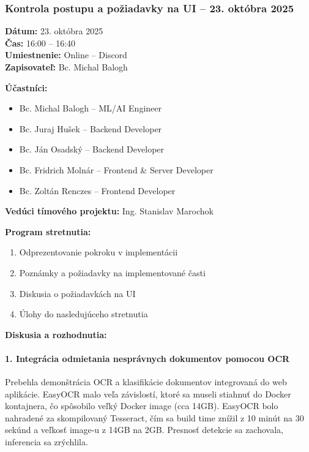 \subsubsection{Kontrola postupu a požiadavky na UI – 23. októbra 2025}

\textbf{Dátum:} 23. októbra 2025 \\
\textbf{Čas:} 16:00 – 16:40 \\
\textbf{Umiestnenie:} Online – Discord \\
\textbf{Zapisovateľ:} Bc. Michal Balogh

\vspace{0.5cm}
\textbf{Účastníci:}
\begin{itemize}
    \item Bc. Michal Balogh – ML/AI Engineer
    \item Bc. Juraj Hušek – Backend Developer
    \item Bc. Ján Osadský – Backend Developer
    \item Bc. Fridrich Molnár – Frontend \& Server Developer
    \item Bc. Zoltán Renczes – Frontend Developer
\end{itemize}

\textbf{Vedúci tímového projektu:} Ing. Stanislav Marochok

\vspace{0.5cm}
\textbf{Program stretnutia:}
\begin{enumerate}
    \item Odprezentovanie pokroku v implementácii
    \item Poznámky a požiadavky na implementované časti
    \item Diskusia o požiadavkách na UI
    \item Úlohy do nasledujúceho stretnutia
\end{enumerate}

\vspace{0.5cm}
\textbf{Diskusia a rozhodnutia:}

\paragraph{1. Integrácia odmietania nesprávnych dokumentov pomocou OCR}
Prebehla demonštrácia OCR a klasifikácie dokumentov integrovaná do web aplikácie. EasyOCR malo veľa závislostí, ktoré sa museli stiahnuť do Docker kontajnera, čo spôsobilo veľký Docker image (cca 14GB). EasyOCR bolo nahradené za skompilovaný Tesseract, čím sa build time znížil z 10 minút na 30 sekúnd a veľkosť image-u z 14GB na 2GB. Presnosť detekcie sa zachovala, inferencia sa zrýchlila.

